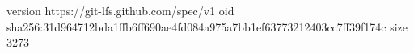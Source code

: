 version https://git-lfs.github.com/spec/v1
oid sha256:31d964712bda1ffb6ff690ae4fd084a975a7bb1ef63773212403cc7ff39f174c
size 3273
